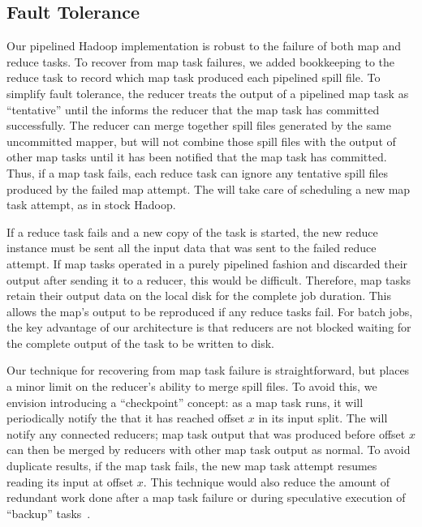 \subsection{Fault Tolerance}
\label{sec:ft}


Our pipelined Hadoop implementation is robust to the failure of both
map and reduce tasks. To recover from map task failures, we added
bookkeeping to the reduce task to record which map task produced each
pipelined spill file. To simplify fault tolerance, the reducer treats
the output of a pipelined map task as ``tentative'' until the {\JT}
informs the reducer that the map task has committed successfully. The
reducer can merge together spill files generated by the same
uncommitted mapper, but will not combine those spill files with the
output of other map tasks until it has been notified that the map task
has committed. Thus, if a map task fails, each reduce task can ignore
any tentative spill files produced by the failed map attempt. The
{\JT} will take care of scheduling a new map task attempt, as in stock
Hadoop. 

If a reduce task fails and a new copy of the task is started, the new
reduce instance must be sent all the input data that was sent to the
failed reduce attempt. If map tasks operated in a purely pipelined
fashion and discarded their output after sending it to a reducer, this
would be difficult. Therefore, map tasks retain their output data on
the local disk for the complete job duration. This allows the map's output to be 
reproduced if any reduce tasks fail. For batch jobs, the key advantage of our architecture is
that reducers are not blocked waiting for the complete output of the
task to be written to disk.

Our technique for recovering from map task failure is straightforward, but
places a minor limit on the reducer's ability to merge spill files. To avoid
this, we envision introducing a ``checkpoint'' concept: as a map task runs, it
will periodically notify the {\JT} that it has reached offset $x$ in its input
split. The {\JT} will notify any connected reducers; map task output that was
produced before offset $x$ can then be merged by reducers with other map task
output as normal. To avoid duplicate results, if the map task fails, the new map
task attempt resumes reading its input at offset $x$. This technique would also
reduce the amount of redundant work done after a map task failure or during
speculative execution of ``backup'' tasks~\cite{mapreduce-osdi}.

